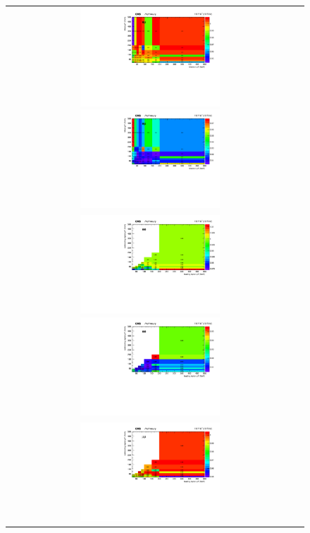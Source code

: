 {\begin{figure}[h]
  \begin{center}
    \begin{tabular}{cc}
      \includegraphics[width=0.50\textwidth]{fig_2016preVFP_TrigSF/h2D_lepABpt_emu.pdf}
      \includegraphics[width=0.50\textwidth]{fig_2016preVFP_TrigSF/h2D_lepABpt_emu_BinErrors.pdf}\\       
      \includegraphics[width=0.50\textwidth]{fig_2016preVFP_TrigSF/h2D_lepABpt_ee.pdf}
      \includegraphics[width=0.50\textwidth]{fig_2016preVFP_TrigSF/h2D_lepABpt_ee_BinErrors.pdf}\\
      \includegraphics[width=0.50\textwidth]{fig_2016preVFP_TrigSF/h2D_lepABpt_mumu.pdf}

\end{tabular}
\end{center}
\end{figure}}
